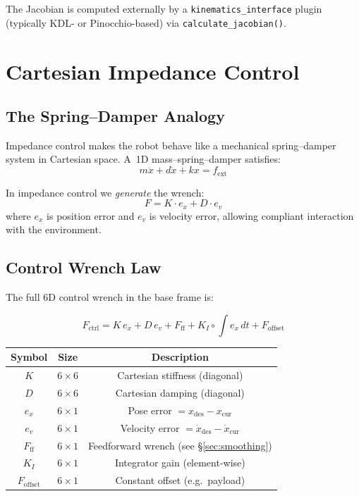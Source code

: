 \documentclass[11pt,a4paper]{article}
\newcommand{\odot}{\circ}  %
\begin{document}
The Jacobian is computed externally by a \texttt{kinematics\_interface} plugin
(typically KDL- or Pinocchio-based) via \texttt{calculate\_jacobian()}.


\section{Cartesian Impedance Control}
\label{sec:cartesian_imp}

\subsection{The Spring--Damper Analogy}

Impedance control makes the robot behave like a mechanical spring--damper system
in Cartesian space.  A~1D mass--spring--damper satisfies:
\[
  m\ddot{x} + d\dot{x} + kx = f_{\text{ext}}
\]

In impedance control we \emph{generate} the wrench:
\[
  F = K \cdot e_x + D \cdot e_v
\]
where $e_x$ is position error and $e_v$ is velocity error, allowing compliant
interaction with the environment.

\subsection{Control Wrench Law}
\label{sec:wrench_law}

The full 6D control wrench in the base frame is:

\begin{keqbox}
\begin{equation}
  F_{\text{ctrl}}
  = K\,e_x + D\,e_v + F_{\text{ff}} + K_I \odot \!\int\! e_x\,dt + F_{\text{offset}}
  \label{eq:wrench}
\end{equation}
\end{keqbox}

\begin{center}
\begin{tabular}{ccc}
\toprule
\textbf{Symbol} & \textbf{Size} & \textbf{Description} \\
\midrule
$K$ & $6\!\times\!6$ & Cartesian stiffness (diagonal) \\
$D$ & $6\!\times\!6$ & Cartesian damping (diagonal) \\
$e_x$ & $6\!\times\!1$ & Pose error $= x_{\text{des}} - x_{\text{cur}}$ \\
$e_v$ & $6\!\times\!1$ & Velocity error $= \dot{x}_{\text{des}} - \dot{x}_{\text{cur}}$ \\
$F_{\text{ff}}$ & $6\!\times\!1$ & Feedforward wrench (see \S\ref{sec:smoothing}) \\
$K_I$ & $6\!\times\!1$ & Integrator gain (element-wise) \\
$F_{\text{offset}}$ & $6\!\times\!1$ & Constant offset (e.g.\ payload) \\
\bottomrule
\end{tabular}
\end{center}
\end{document}
